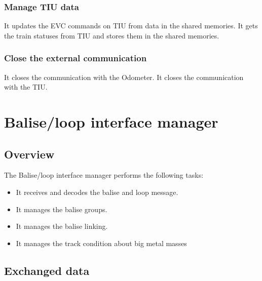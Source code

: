 \documentclass[nocc]{template/openetcs_report}
\begin{document}
\subsection{Manage TIU data}
It updates the EVC commands on TIU from data in the shared memories.
It gets the train statuses from TIU and stores them in the shared memories.
\subsection{Close the external communication}
It closes the communication with the Odometer.
It closes the communication with the TIU.
\chapter{Balise/loop interface manager}
\section{Overview}
The Balise/loop interface manager performs the following tasks:
\begin{itemize}
\item It receives and decodes the balise and loop message.
\item It manages the balise groups.
\item It manages the balise linking.
\item It manages the track condition about big metal masses
\end{itemize}
\section{Exchanged data}
\end{document}
